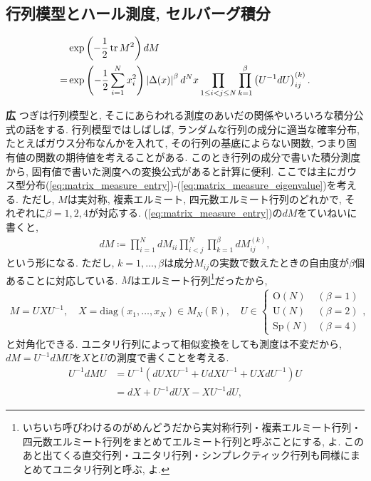 \documentclass{ltjsarticle}
\theoremstyle{definition}
\newcommand{\parno}{\par\noindent}
\begin{document}
\subsection{行列模型とハール測度, セルバーグ積分}
\begin{tcolorbox}
  \begin{align}
    &\exp\left(-\frac12\tr M^2\right)dM\label{eq:matrix_measure_entry}\\
    =&\exp\left(-\frac12\sum_{i=1}^Nx_i^2\right)\left|\Delta(x)\right|^\beta d^Nx\prod_{1\le i<j\le N}\prod_{k=1}^\beta\left(U^{-1}dU\right)_{ij}^{(k)}.\label{eq:matrix_measure_eigenvalue}
  \end{align}
\end{tcolorbox}
\parno
\textbf{広} つぎは行列模型と, そこにあらわれる測度のあいだの関係やいろいろな積分公式の話をする. 行列模型ではしばしば, ランダムな行列の成分に適当な確率分布, たとえばガウス分布なんかを入れて, その行列の基底によらない関数, つまり固有値の関数の期待値を考えることがある. このとき行列の成分で書いた積分測度から, 固有値で書いた測度への変換公式があると計算に便利. ここでは主にガウス型分布(\ref{eq:matrix_measure_entry})-(\ref{eq:matrix_measure_eigenvalue})を考える. ただし, $M$は実対称, 複素エルミート, 四元数エルミート行列のどれかで, それぞれに$\beta=1,2,4$が対応する. (\ref{eq:matrix_measure_entry})の$dM$をていねいに書くと,
\begin{gather}
  dM\coloneqq\prod_{i=1}^NdM_{ii}\prod_{i<j}^N\prod_{k=1}^\beta dM_{ij}^{(k)},
\end{gather}
という形になる. ただし, $k=1,\dots,\beta$は成分$M_{ij}$の実数で数えたときの自由度が$\beta$個あることに対応している. $M$はエルミート行列\footnote{いちいち呼びわけるのがめんどうだから実対称行列・複素エルミート行列・四元数エルミート行列をまとめてエルミート行列と呼ぶことにする, よ. このあと出てくる直交行列・ユニタリ行列・シンプレクティック行列も同様にまとめてユニタリ行列と呼ぶ, よ.}だったから,
\begin{align}
  M=UXU^{-1},\quad X=\mathrm{diag}(x_1,\dots,x_N)\in M_N(\mathbb R),\quad U\in
  \begin{cases}
    \mathrm O(N)&(\beta=1)\\
    \mathrm U(N)&(\beta=2)\\
    \mathrm{Sp}(N)&(\beta=4)
  \end{cases},\label{eq:diagonalisation_matrix_model}
\end{align}
と対角化できる. ユニタリ行列によって相似変換をしても測度は不変だから, $dM=U^{-1}dMU$を$X$と$U$の測度で書くことを考える.
\begin{align}
  U^{-1}dMU&=U^{-1}\left(dUXU^{-1}+UdXU^{-1}+UXdU^{-1}\right)U\\
  &=dX+U^{-1}dUX-XU^{-1}dU,
\end{align}
\end{document}
